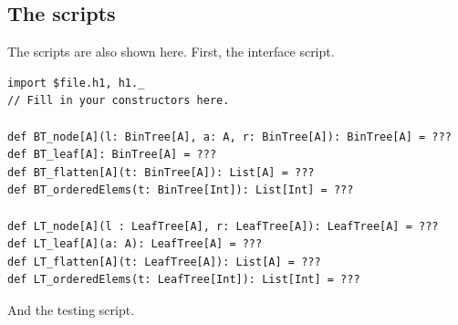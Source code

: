 \documentclass[11pt]{article}
\begin{document}
\subsection*{The scripts}
\label{sec:orga6cd1ff}
The scripts are also shown here. First, the interface script.
\begin{verbatim}
import $file.h1, h1._
// Fill in your constructors here.

def BT_node[A](l: BinTree[A], a: A, r: BinTree[A]): BinTree[A] = ???
def BT_leaf[A]: BinTree[A] = ???
def BT_flatten[A](t: BinTree[A]): List[A] = ???
def BT_orderedElems(t: BinTree[Int]): List[Int] = ???

def LT_node[A](l : LeafTree[A], r: LeafTree[A]): LeafTree[A] = ???
def LT_leaf[A](a: A): LeafTree[A] = ???
def LT_flatten[A](t: LeafTree[A]): List[A] = ???
def LT_orderedElems(t: LeafTree[Int]): List[Int] = ???
\end{verbatim}
And the testing script.
\end{document}
